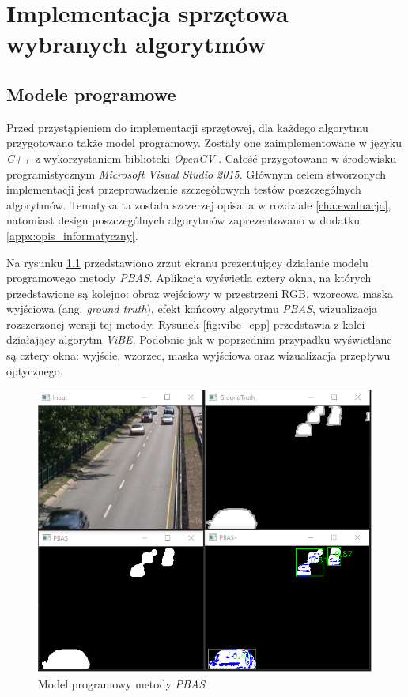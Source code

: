 \chapter{Implementacja sprzętowa wybranych algorytmów}
\label{cha:implementacja_sprzetowa}

\section{Modele programowe}
\label{sec:modele_programowe}

Przed przystąpieniem do implementacji sprzętowej, dla każdego algorytmu przygotowano także model programowy. Zostały one zaimplementowane w języku \textit{C++} z wykorzystaniem biblioteki \textit{OpenCV} \cite{opencv_17}. Całość przygotowano w środowisku programistycznym \textit{Microsoft Visual Studio 2015}. Głównym celem stworzonych implementacji jest przeprowadzenie szczegółowych testów poszczególnych algorytmów. Tematyka ta została szczerzej opisana w rozdziale \ref{cha:ewaluacja}, natomiast design poszczególnych algorytmów zaprezentowano w dodatku \ref{appx:opis_informatyczny}.

Na rysunku \ref{fig:pbas_cpp} przedstawiono zrzut ekranu prezentujący działanie modelu programowego metody \textit{PBAS}. Aplikacja wyświetla cztery okna, na których przedstawione są kolejno: obraz wejściowy w przestrzeni RGB, wzorcowa maska wyjściowa (ang. \textit{ground truth}), efekt końcowy algorytmu \textit{PBAS}, wizualizacja rozszerzonej wersji tej metody. Rysunek \ref{fig:vibe_cpp} przedstawia z kolei działający algorytm \textit{ViBE}. Podobnie jak w poprzednim przypadku wyświetlane są cztery okna: wyjście, wzorzec, maska wyjściowa oraz wizualizacja przepływu optycznego.

    \begin{figure}[h!]
        \centering
        \includegraphics[scale=0.55]{img/4/pbas_module_cpp.png}
        \caption{Model programowy metody \textit{PBAS}}
	    \label{fig:pbas_cpp}
    \end{figure}


